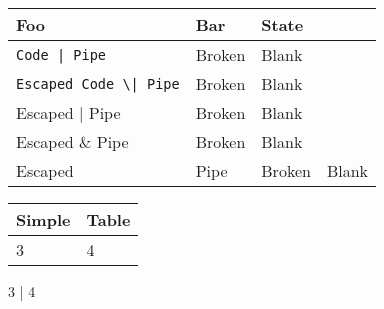 \begin{tabular}{|l|l|l|}\hline
Foo & Bar & State\\ \hline
\lstinline`Code | Pipe` & Broken & Blank\\ \hline
\lstinline`Escaped Code \| Pipe` & Broken & Blank\\ \hline
Escaped | Pipe & Broken & Blank\\ \hline
Escaped \& Pipe & Broken & Blank\\ \hline
Escaped \ & Pipe & Broken & Blank\\ \hline
\end{tabular}
\begin{tabular}{|l|l|}\hline
Simple & Table\\ \hline
3      & 4\\ \hline
\end{tabular}
3      | 4

